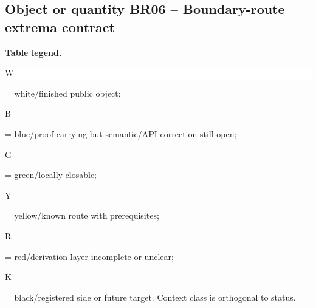 \subsection*{Object or quantity BR06 -- Boundary-route extrema contract}
\hypertarget{objproof:BR06}{}
\par\smallskip\noindent\begin{minipage}{0.99\linewidth}\footnotesize\raggedright\textbf{Table legend.} \colorbox{white}{\strut W} = white/finished public object; \colorbox{cyan!20}{\strut B} = blue/proof-carrying but semantic/API correction still open; \colorbox{green!18}{\strut G} = green/locally closable; \colorbox{yellow!25}{\strut Y} = yellow/known route with prerequisites; \colorbox{red!20}{\strut R} = red/derivation layer incomplete or unclear; \colorbox{black!18}{\strut K} = black/registered side or future target. Context class is orthogonal to status.\end{minipage}\par\vspace{0.25em}
